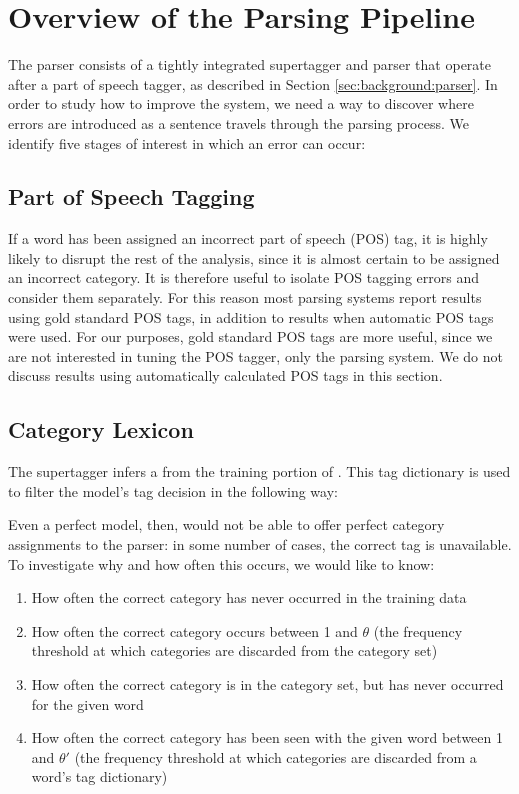 \section{Overview of the Parsing Pipeline}

The \candc parser consists of a tightly integrated supertagger and parser that operate after a part of speech tagger, as described in Section \ref{sec:background:parser}. In order to study how to improve the system, we need a way to discover where errors are introduced as a sentence travels through the parsing process. We identify five stages of interest in which an error can occur:

\subsection{Part of Speech Tagging}

If a word has been assigned an incorrect part of speech (POS) tag, it is highly likely to disrupt the rest of the analysis, since it is almost certain to be assigned an incorrect \ccg category. It is therefore useful to isolate POS tagging errors and consider them separately. For this reason most parsing systems report results using gold standard POS tags, in addition to results when automatic POS tags were used. For our purposes, gold standard POS tags are more useful, since we are not interested in tuning the POS tagger, only the parsing system. We do not discuss results using automatically calculated POS tags in this section.

\subsection{Category Lexicon}

The \candc supertagger infers a  from the training portion of \ccgbank. This tag dictionary is used to filter the model's tag decision in the following way:


Even a perfect model, then, would not be able to offer perfect category assignments to the parser: in some number of cases, the correct tag is unavailable. To investigate why and how often this occurs, we would like to know:

\begin{enumerate}
 \item How often the correct category has never occurred in the training data
 \item How often the correct category occurs between 1 and $\theta$ (the frequency threshold at which categories are discarded from the category set)
 \item How often the correct category is in the category set, but has never occurred for the given word
 \item How often the correct category has been seen with the given word between 1 and $\theta'$ (the frequency threshold at which categories are discarded from a word's tag dictionary)
\end{enumerate}

